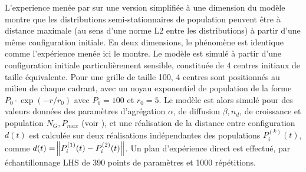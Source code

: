 \documentclass[11pt]{article}
\begin{document}
L'experience menée par \cite{raimbault2018calibration} sur une version simplifiée à une dimension du modèle montre que les distributions semi-stationnaires de population peuvent être à distance maximale (au sens d'une norme L2 entre les distributions) à partir d'une même configuration initiale. En deux dimensions, le phénomène est identique comme l'expérience menée ici le montre. Le modèle est simulé à partir d'une configuration initiale particulièrement sensible, constituée de 4 centres initiaux de taille équivalente. Pour une grille de taille 100, 4 centres sont positionnés au milieu de chaque cadrant, avec un noyau exponentiel de population de la forme $P_0 \cdot \exp \left(-r/r_0\right)$ avec $P_0 = 100$ et $r_0 = 5$. Le modèle est alors simulé pour des valeurs données des paramètres d'agrégation $\alpha$, de diffusion $\beta, n_d$, de croissance et population $N_G, P_{max}$ (voir \cite{raimbault2018calibration}), et une réalisation de la distance entre configuration $d(t)$ est calculée sur deux réalisations indépendantes des populations $P^{(k)}_i(t)$, comme $d(t)=\norm{P^{(1)}_i(t) - P^{(2)}_i(t)}$. Un plan d'expérience direct est effectué, par échantillonnage LHS de 390 points de paramètres et 1000 répétitions.



\end{document}
